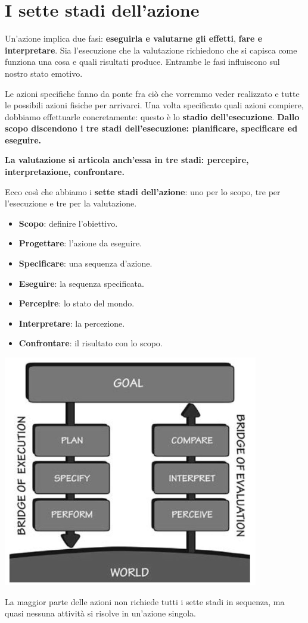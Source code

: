 \documentclass[a4paper,11pt,oneside]{book}
\begin{document}
\section{I sette stadi dell'azione}
Un'azione implica due fasi: \textbf{eseguirla e valutarne gli effetti}, \textbf{fare e interpretare}. Sia l'esecuzione che la valutazione richiedono che si capisca come funziona una cosa e quali risultati produce. Entrambe le fasi influiscono sul nostro stato emotivo.

Le azioni specifiche fanno da ponte fra ciò che vorremmo veder realizzato e tutte le possibili azioni fisiche per arrivarci. Una volta specificato quali azioni compiere, dobbiamo effettuarle concretamente: questo è lo \textbf{stadio dell'esecuzione}. \textbf{Dallo scopo discendono i tre stadi dell'esecuzione: pianificare, specificare ed eseguire.}

\textbf{La valutazione si articola anch'essa in tre stadi: percepire, interpretazione, confrontare.}

Ecco così che abbiamo i \textbf{sette stadi dell'azione}: uno per lo scopo, tre per l'esecuzione e tre per la valutazione.
\begin{itemize}
	\item \textbf{Scopo}: definire l'obiettivo.
	\item \textbf{Progettare}: l'azione da eseguire.
	\item \textbf{Specificare}: una sequenza d'azione.
	\item \textbf{Eseguire}: la sequenza specificata.
	\item \textbf{Percepire}: lo stato del mondo.
	\item \textbf{Interpretare}: la percezione.
	\item \textbf{Confrontare}: il risultato con lo scopo.
\end{itemize}
\begin{center}
	\includegraphics[width=0.5\linewidth]{"immagini/Sette stadi"}
\end{center}
La maggior parte delle azioni non richiede tutti i sette stadi in sequenza, ma quasi nessuna attività si risolve in un'azione singola.
\end{document}
